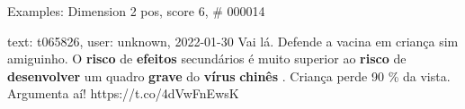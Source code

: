 \begin{frame}{Examples: Dimension 2 pos, score 6, \# 000014}
\footnotesize
\begin{exampleblock}{text: t065826, user: unknown, 2022-01-30}
Vai lá. Defende a vacina em criança sim amiguinho. O \textbf{risco} de 
\textbf{efeitos} secundários é muito superior ao \textbf{risco} de 
\textbf{desenvolver} um quadro \textbf{grave} do \textbf{vírus} \textbf{chinês} 
. Criança perde 90 \% da vista. Argumenta aí! https://t.co/4dVwFnEwsK 
\end{exampleblock}
\end{frame}
